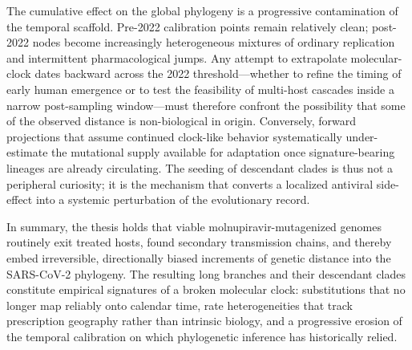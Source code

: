 The cumulative effect on the global phylogeny is a progressive contamination of the temporal scaffold. Pre-2022 calibration points remain relatively clean; post-2022 nodes become increasingly heterogeneous mixtures of ordinary replication and intermittent pharmacological jumps. Any attempt to extrapolate molecular-clock dates backward across the 2022 threshold—whether to refine the timing of early human emergence or to test the feasibility of multi-host cascades inside a narrow post-sampling window—must therefore confront the possibility that some of the observed distance is non-biological in origin. Conversely, forward projections that assume continued clock-like behavior systematically under-estimate the mutational supply available for adaptation once signature-bearing lineages are already circulating. The seeding of descendant clades is thus not a peripheral curiosity; it is the mechanism that converts a localized antiviral side-effect into a systemic perturbation of the evolutionary record.

In summary, the thesis holds that viable molnupiravir-mutagenized genomes routinely exit treated hosts, found secondary transmission chains, and thereby embed irreversible, directionally biased increments of genetic distance into the SARS-CoV-2 phylogeny. The resulting long branches and their descendant clades constitute empirical signatures of a broken molecular clock: substitutions that no longer map reliably onto calendar time, rate heterogeneities that track prescription geography rather than intrinsic biology, and a progressive erosion of the temporal calibration on which phylogenetic inference has historically relied.
